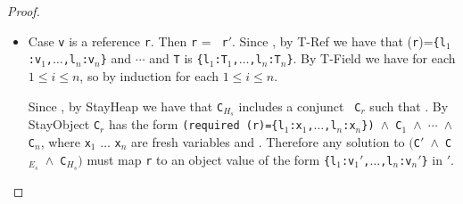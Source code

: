 \begin{proof}
\begin{itemize}
\begin{itemize}
Therefore in either case, there must be some constraint on an l-value
{\tt L$''$} in {\tt C}, where
 but
.
By Lemma~\ref{lem:valueImpliesType} there is some {\tt T$''$} such
that 
and .  The last rule in the derivation of
 must be {\sc T-Constant} so {\tt T$''$}
is {\tt PrimitiveType}.
We argue a contradiction by case analysis of the immediate parent
expression of any occurrence of {\tt L$''$} in {\tt C}.  We are given  so this parent
expression must also be well typed.
  \begin{itemize}
   \item Case {\tt L$''$.l}.  Then by {\sc T-Field} {\tt L$''$} must have a
     record type, contradicting the fact that .
  \item Case {\tt L$''$} is an immediate subexpression of a $\oplus$,
    $\olessthan$, or $\ovee$ operation.  But these operations only
    apply to primitives, so the solver cannot satisfy them by
    assigning {\tt x} to {\tt r$'$}.
  \item Case {\tt $\rho$ L$''$}.  This constraint is only satisfied if
    {\tt x} is a boolean, so the solver will not assign {\tt x} to
    {\tt r$'$}.
  \end{itemize}

  \end{itemize}

\item Case {\tt v} is a reference {\tt r}.  Then {\tt r} = {\tt
    r$'$}.  Since , by {\sc T-Ref} we have
  that \texttt{\Huid}(\texttt{r})=\texttt{\{l$_1$:v$_1$,$\ldots$,l$_n$:v$_n$\}}
    and
   $\cdots$
   and {\tt T} is
  \texttt{\{l$_1$:T$_1$,$\ldots$,l$_n$:T$_n$\}}.  By {\sc T-Field} we
  have  for each $1 \leq i \leq n$,
  so by induction  for each $1
  \leq i \leq n$.

 Since , by
  {\sc StayHeap} we have that {\tt C$_{H_s}$} includes a conjunct {\tt
    C$_r$} such that .
By {\sc StayObject} {\tt C$_r$} has the form {\tt (required \Deref(r)=\{l$_1$:x$_1$,$\ldots$,l$_n$:x$_n$\}) $\wedge$
    C$_{1}$ $\wedge$
    $\cdots$ $\wedge$
    C$_{n}$}, where {\tt x$_1$} $\ldots$ {\tt x$_n$} are fresh
  variables and .  Therefore any solution to {\tt $($C$'$ $\wedge$ C$_{E_s}$ $\wedge$
      C$_{H_s}$$)$} must map {\tt r} to an object value of the form
    {\tt  \{l$_1$:v$_1'$,$\ldots$,l$_n$:v$_n'$\}} in {\tt \Huid$'$}.
    

\end{itemize}
\end{proof}
